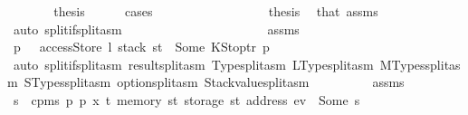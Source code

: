 \begin{isabellebody}
\ \ \ \ \isamarkupfalse%
\ \isamarkupfalse%
\ {\isacharquery}{\kern0pt}thesis\isanewline
\ \ \ \ \isamarkupfalse%
\ cases\isanewline
\ \ \ \ \ \ \isamarkupfalse%
\ {}{}\isanewline
\ \ \ \ \ \ \isamarkupfalse%
\ \isamarkupfalse%
\ {\isacharquery}{\kern0pt}thesis\ \isamarkupfalse%
\ that{\isacharparenleft}{\kern0pt}{}{\isacharparenright}{\kern0pt}\ assms\ {}\ \isamarkupfalse%
\ {\isacharparenleft}{\kern0pt}auto\ split{\isacharcolon}{\kern0pt}if{\isacharunderscore}{\kern0pt}split{\isacharunderscore}{\kern0pt}asm{\isacharparenright}{\kern0pt}\isanewline
\ \ \ \ \isamarkupfalse%
\isanewline
\ \ \ \ \ \ \isamarkupfalse%
\ {}{}\isanewline
\ \ \ \ \ \ \isamarkupfalse%
\ \isamarkupfalse%
\ assms\ {}\ {}{}\ \isamarkupfalse%
\ p{\isacharprime}{\kern0pt}\ \ {}{\isacharcolon}{\kern0pt}\ {\isachardoublequoteopen}accessStore\ l\ {\isacharparenleft}{\kern0pt}stack\ st{\isacharparenright}{\kern0pt}\ {\isacharequal}{\kern0pt}\ Some\ {\isacharparenleft}{\kern0pt}KStoptr\ p{\isacharprime}{\kern0pt}{\isacharparenright}{\kern0pt}{\isachardoublequoteclose}\isanewline
\ \ \ \ \ \ \ \ \isamarkupfalse%
\ {\isacharparenleft}{\kern0pt}auto\ split{\isacharcolon}{\kern0pt}if{\isacharunderscore}{\kern0pt}split{\isacharunderscore}{\kern0pt}asm\ result{\isachardot}{\kern0pt}split{\isacharunderscore}{\kern0pt}asm\ Type{\isachardot}{\kern0pt}split{\isacharunderscore}{\kern0pt}asm\ LType{\isachardot}{\kern0pt}split{\isacharunderscore}{\kern0pt}asm\ MTypes{\isachardot}{\kern0pt}split{\isacharunderscore}{\kern0pt}asm\ STypes{\isachardot}{\kern0pt}split{\isacharunderscore}{\kern0pt}asm\ option{\isachardot}{\kern0pt}split{\isacharunderscore}{\kern0pt}asm\ Stackvalue{\isachardot}{\kern0pt}split{\isacharunderscore}{\kern0pt}asm{\isacharparenright}{\kern0pt}\isanewline
\ \ \ \ \ \ \isamarkupfalse%
\ \isamarkupfalse%
\ assms\ {}\ {}{}\ {}\ {}\ \isamarkupfalse%
\ s\ \ {\isachardoublequoteopen}cpm{}s\ p\ p{\isacharprime}{\kern0pt}\ x\ t\ {\isacharparenleft}{\kern0pt}memory\ st{\isacharparenright}{\kern0pt}\ {\isacharparenleft}{\kern0pt}storage\ st\ {\isacharparenleft}{\kern0pt}address\ ev{\isacharparenright}{\kern0pt}{\isacharparenright}{\kern0pt}\ {\isacharequal}{\kern0pt}\ Some\ s{\isachardoublequoteclose}\isanewline

\end{isabellebody}
